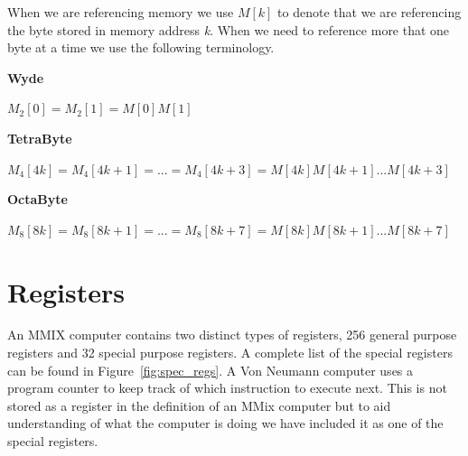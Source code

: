 \documentclass[a4paper,11pt]{report}
\begin{document}
When we are referencing memory we use \begin{math}M[k]\end{math} to denote that we are referencing the byte stored in memory address \textit{k}. When we need to reference more that one byte at a time we use the following terminology.

\textbf{Wyde}

\begin{math}
M_2[0] = M_2[1] = M[0]M[1]
\end{math}

\textbf{TetraByte}

\begin{math}
M_4[4k] = M_4[4k+1] = ... = M_4[4k+3] = M[4k]M[4k+1]...M[4k+3]
\end{math}

\textbf{OctaByte}

\begin{math}
M_8[8k] = M_8[8k+1] = ... = M_8[8k+7] = M[8k]M[8k+1]...M[8k+7]
\end{math}

\section{Registers}\label{registers}
An MMIX computer contains two distinct types of registers, 256 general purpose registers and 32 special purpose registers. A complete list of the special registers can be found in Figure~\ref{fig:spec_regs}. A Von Neumann computer uses a program counter to keep track of which instruction to execute next. This is not stored as a register in the definition of an MMix computer but to aid understanding of what the computer is doing we have included it as one of the special registers.
\end{document}
